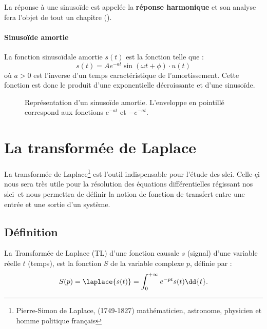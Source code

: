 La réponse à une sinuso\"ide est appelée la \textbf{réponse harmonique}
et son analyse fera l'objet de tout un chapitre ().

\paragraph{Sinuso\"ide amortie}
La fonction sinuso\"idale amortie $s(t)$ est la fonction telle que :
$$
s(t)=Ae^{-at}\sin{(\omega t +\phi)}\cdot u(t)
$$
où $a>0$ est l'inverse d'un temps caractéristique de l'amortissement.
Cette fonction est donc le produit d'une exponentielle décroissante et d'une sinuso\"ide.
\begin{figure}[!h]
\begin{center}

\end{center}
    \caption{Représentation d'un sinuso\"ide amortie. L'enveloppe en pointillé 
correspond aux fonctions $e^{-at}$ et $-e^{-at}$.\label{fig-sin_amor}}
\end{figure}


\newpage
\section{La transformée de Laplace}
La transformée de Laplace\footnote{Pierre-Simon de Laplace, (1749-1827) 
mathématicien, astronome, physicien et homme politique français} est l'outil indispensable 
pour l'étude des \gls{slci}. Celle-çi nous sera très utile pour 
la résolution des équations différentielles 
régissant nos \gls{slci}~et nous permettra 
de définir la notion de fonction de transfert entre une entrée 
et une sortie d'un système.



\subsection{Définition}
La Transformée de Laplace (TL) d'une fonction causale $s$ (signal) 
d'une variable réelle $t$ (temps), est la fonction $S$ 
de la variable complexe $p$, définie par :
\begin{align}
S(p)=\laplace{s(t)}=\int_{0}^{+\infty} e^{-pt}s(t)\dd{t}.\label{eq-lap}
\end{align}


